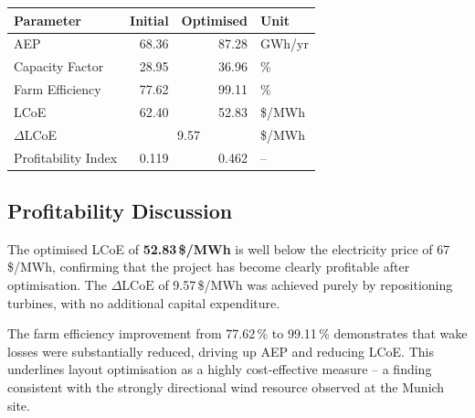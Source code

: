 \documentclass[11pt,a4paper]{article}
\begin{document}
	\begin{center}
		\begin{tabular}{lrrl}
			\toprule
			\textbf{Parameter} & \textbf{Initial} & \textbf{Optimised} & \textbf{Unit} \\
			\midrule
			AEP                   & 68.36 & 87.28 & GWh/yr \\
			Capacity Factor       & 28.95 & 36.96 & \%     \\
			Farm Efficiency       & 77.62 & 99.11 & \%     \\
			LCoE                  & 62.40 & 52.83 & \$/MWh \\
			$\Delta$LCoE          & \multicolumn{2}{c}{9.57} & \$/MWh \\
			Profitability Index   &  0.119 &  0.462 & --    \\
			\bottomrule
		\end{tabular}
	\end{center}

	\subsection{Profitability Discussion}

	The optimised LCoE of \textbf{52.83\,\$/MWh} is well below the electricity price
	of 67\,\$/MWh, confirming that the project has become clearly profitable after
	optimisation.  The $\Delta\mathrm{LCoE}$ of 9.57\,\$/MWh was achieved purely by
	repositioning turbines, with no additional capital expenditure.

	The farm efficiency improvement from 77.62\,\% to 99.11\,\% demonstrates that
	wake losses were substantially reduced, driving up AEP and reducing LCoE.  This
	underlines layout optimisation as a highly cost-effective measure -- a finding
	consistent with the strongly directional wind resource observed at the Munich site.
\end{document}
